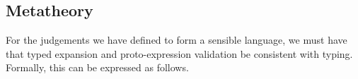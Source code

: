 




\subsection{Metatheory}
For the judgements we have defined to form a sensible language, we must have that typed expansion and proto-expression validation be consistent with typing. Formally, this can be expressed as follows.


